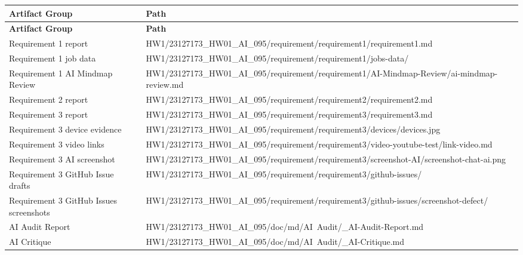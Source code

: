 \documentclass[12pt, a4paper]{article}
\begin{document}
\begin{longtable}{@{} L{4.8cm} p{9.2cm} @{}}
\toprule
{}
\textbf{Artifact Group} & \textbf{Path} \\
\midrule
\endfirsthead
\toprule
{}
\textbf{Artifact Group} & \textbf{Path} \\
\midrule
\endhead
\bottomrule
\endfoot
Requirement 1 report
  & {\small\ttfamily HW1/23127173\_HW01\_AI\_095/requirement/requirement1/\allowbreak requirement1.md} \\[2pt]
Requirement 1 job data
  & {\small\ttfamily HW1/23127173\_HW01\_AI\_095/requirement/requirement1/\allowbreak jobs-data/} \\[2pt]
Requirement 1 AI Mindmap Review
  & {\small\ttfamily HW1/23127173\_HW01\_AI\_095/requirement/requirement1/\allowbreak AI-Mindmap-Review/ai-mindmap-review.md} \\[2pt]
Requirement 2 report
  & {\small\ttfamily HW1/23127173\_HW01\_AI\_095/requirement/requirement2/\allowbreak requirement2.md} \\[2pt]
Requirement 3 report
  & {\small\ttfamily HW1/23127173\_HW01\_AI\_095/requirement/requirement3/\allowbreak requirement3.md} \\[2pt]
Requirement 3 device evidence
  & {\small\ttfamily HW1/23127173\_HW01\_AI\_095/requirement/requirement3/\allowbreak devices/devices.jpg} \\[2pt]
Requirement 3 video links
  & {\small\ttfamily HW1/23127173\_HW01\_AI\_095/requirement/requirement3/\allowbreak video-youtube-test/link-video.md} \\[2pt]
Requirement 3 AI screenshot
  & {\small\ttfamily HW1/23127173\_HW01\_AI\_095/requirement/requirement3/\allowbreak screenshot-AI/screenshot-chat-ai.png} \\[2pt]
Requirement 3 GitHub Issue drafts
  & {\small\ttfamily HW1/23127173\_HW01\_AI\_095/requirement/requirement3/\allowbreak github-issues/} \\[2pt]
Requirement 3 GitHub Issues screenshots
  & {\small\ttfamily HW1/23127173\_HW01\_AI\_095/requirement/requirement3/\allowbreak github-issues/screenshot-defect/} \\[2pt]
AI Audit Report
  & {\small\ttfamily HW1/23127173\_HW01\_AI\_095/doc/md/AI~Audit/\_AI-Audit-Report.md} \\[2pt]
AI Critique
  & {\small\ttfamily HW1/23127173\_HW01\_AI\_095/doc/md/AI~Audit/\_AI-Critique.md} \\[2pt]

\end{longtable}
\end{document}
